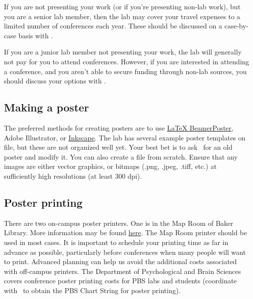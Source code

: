 \documentclass{tufte-book} %
\begin{document}
 If you are not presenting your work (or if you're presenting non-lab
 work), but you are a senior lab member, then the lab may cover your
 travel expenses to a limited number of conferences each year.  These
 should be discussed on a case-by-case basis with \director.

 If you are a junior lab member not presenting your work, the lab will
 generally not pay for you to attend conferences.  However, if you are
 interested in attending a conference, and you aren't able to secure
 funding through non-lab sources, you should discuss your options with
 \director.

 \subsection{Making a poster}
  The preferred methods for creating posters are to use
 \href{https://github.com/deselaers/latex-beamerposter}{LaTeX
   BeamerPoster}, Adobe Illustrator, or
 \href{https://inkscape.org/en/}{Inkscape}.  The lab has several
 example poster templates on file, but these are not organized well
 yet.  Your best bet is to ask \director~for an old poster and modify
 it.  You can also create a file from scratch.  Ensure that any images
 are either vector graphics, or bitmaps (.png, .jpeg, .tiff, etc.) at
 sufficiently high resolutions (at least 300 dpi).


 \subsection{Poster printing}
   There are two
 on-campus poster printers.  One is in the Map Room of Baker Library.
 More information may be found
 \href{http://www.dartmouth.edu/~library/maproom/printingfaq.html}{here}.
 The Map Room printer should be used in most cases.  It is important
 to schedule your printing time as far in advance as possible,
 particularly before conferences when many people will want to print.
 Advanced planning can help us avoid the additional costs associated
 with off-campus printers.  The Department of Psychological and Brain
 Sciences covers conference poster printing costs for PBS labs and
 students (coordinate with \coordinator~to obtain the PBS Chart String
 for poster printing).
\end{document}
